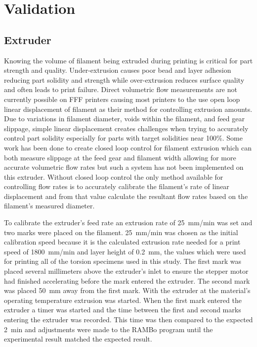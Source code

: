 \documentclass[main.tex]{subfiles}
\begin{document}
\chapter{Validation}

\section{Extruder}
Knowing the volume of filament being extruded during printing is critical for part strength and quality.
Under-extrusion causes poor bead and layer adhesion reducing part solidity and strength while over-extrusion reduces surface quality and often leads to print failure.
Direct volumetric flow measurements are not currently possible on FFF printers causing most printers to the use open loop linear displacement of filament as their method for controlling extrusion amounts.
Due to variations in filament diameter, voids within the filament, and feed gear slippage, simple linear displacement creates challenges when trying to accurately control part solidity especially for parts with target solidities near 100\%.
Some work has been done to create closed loop control for filament extrusion \cite{Greeff2017} which can both measure slippage at the feed gear and filament width allowing for more accurate volumetric flow rates but such a system has not been implemented on this extruder.
Without closed loop control the only method available for controlling flow rates is to accurately calibrate the filament's rate of linear displacement and from that value calculate the resultant flow rates based on the filament's measured diameter.

To calibrate the extruder's feed rate an extrusion rate of \SI{25}{mm/min} was set and two marks were placed on the filament.
\SI{25}{mm/min} was chosen as the initial calibration speed because it is the calculated extrusion rate needed for a print speed of \SI{1800}{mm/min} and layer height of \SI{0.2}{mm}, the values which were used for printing all of the torsion specimens used in this study.
The first mark was placed several millimeters above the extruder's inlet to ensure the stepper motor had finished accelerating before the mark entered the extruder.
The second mark was placed \SI{50}{mm} away from the first mark.
With the extruder at the material's operating temperature extrusion was started.
When the first mark entered the extruder a timer was started and the time between the first and second marks entering the extruder was recorded.
This time was then compared to the expected \SI{2}{min} and adjustments were made to the RAMBo program until the experimental result matched the expected result.
\end{document}
